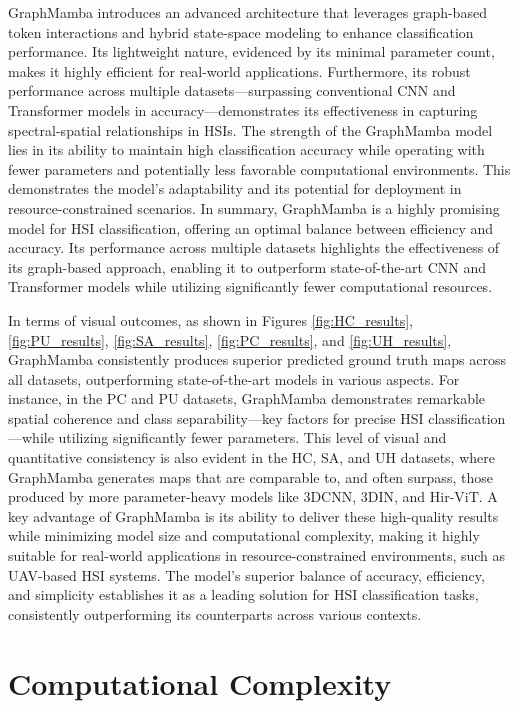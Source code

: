 \documentclass[journal]{IEEEtran}
\begin{document}
GraphMamba introduces an advanced architecture that leverages graph-based token interactions and hybrid state-space modeling to enhance classification performance. Its lightweight nature, evidenced by its minimal parameter count, makes it highly efficient for real-world applications. Furthermore, its robust performance across multiple datasets—surpassing conventional CNN and Transformer models in accuracy—demonstrates its effectiveness in capturing spectral-spatial relationships in HSIs. The strength of the GraphMamba model lies in its ability to maintain high classification accuracy while operating with fewer parameters and potentially less favorable computational environments. This demonstrates the model’s adaptability and its potential for deployment in resource-constrained scenarios. In summary, GraphMamba is a highly promising model for HSI classification, offering an optimal balance between efficiency and accuracy. Its performance across multiple datasets highlights the effectiveness of its graph-based approach, enabling it to outperform state-of-the-art CNN and Transformer models while utilizing significantly fewer computational resources.

In terms of visual outcomes, as shown in Figures \ref{fig:HC_results}, \ref{fig:PU_results}, \ref{fig:SA_results}, \ref{fig:PC_results}, and \ref{fig:UH_results}, GraphMamba consistently produces superior predicted ground truth maps across all datasets, outperforming state-of-the-art models in various aspects. For instance, in the PC and PU datasets, GraphMamba demonstrates remarkable spatial coherence and class separability—key factors for precise HSI classification—while utilizing significantly fewer parameters. This level of visual and quantitative consistency is also evident in the HC, SA, and UH datasets, where GraphMamba generates maps that are comparable to, and often surpass, those produced by more parameter-heavy models like 3DCNN, 3DIN, and Hir-ViT. A key advantage of GraphMamba is its ability to deliver these high-quality results while minimizing model size and computational complexity, making it highly suitable for real-world applications in resource-constrained environments, such as UAV-based HSI systems. The model's superior balance of accuracy, efficiency, and simplicity establishes it as a leading solution for HSI classification tasks, consistently outperforming its counterparts across various contexts.

\section{Computational Complexity}
\label{Complexity}
\end{document}
